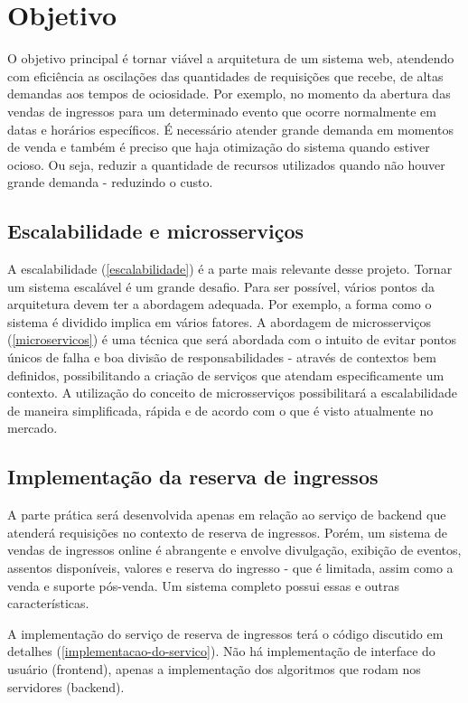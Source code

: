 \chapter{Objetivo}

O objetivo principal é tornar viável a arquitetura de um sistema web, atendendo com eficiência
as oscilações das quantidades de requisições que recebe, de altas demandas aos tempos de ociosidade.
Por exemplo, no momento da abertura das vendas de ingressos para um determinado evento
que ocorre normalmente em datas e horários específicos. É necessário atender grande demanda
em momentos de venda e também é preciso que haja otimização do sistema quando estiver ocioso.
Ou seja, reduzir a quantidade de recursos utilizados quando não houver
grande demanda - reduzindo o custo.

\section{Escalabilidade e microsserviços}
A escalabilidade (\autoref{escalabilidade}) é a parte mais relevante desse projeto.
Tornar um sistema escalável é um grande desafio.
Para ser possível, vários pontos da arquitetura devem ter a
abordagem adequada. Por exemplo, a forma como o sistema é dividido implica em vários
fatores.
A abordagem de microsserviços (\autoref{microservicos}) é uma técnica que será abordada
com o intuito de evitar pontos únicos de falha e boa divisão de responsabilidades
- através de contextos bem definidos, possibilitando a criação de serviços que
atendam especificamente um contexto.
A utilização do conceito de microsserviços possibilitará a escalabilidade de maneira
simplificada, rápida e de acordo com o que é visto atualmente no mercado.

\section{Implementação da reserva de ingressos}

A parte prática será desenvolvida apenas em relação ao serviço de backend que
atenderá requisições no contexto de reserva de ingressos.
Porém, um sistema de vendas de ingressos online é abrangente e envolve divulgação,
exibição de eventos, assentos disponíveis, valores e reserva do ingresso -
que é limitada, assim como a venda e suporte pós-venda. Um sistema completo possui essas
e outras características.

A implementação do serviço de reserva de ingressos terá o código discutido
em detalhes (\autoref{implementacao-do-servico}). Não há implementação
de interface do usuário (frontend), apenas a implementação dos algoritmos
que rodam nos servidores (backend).


